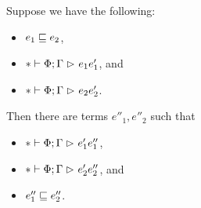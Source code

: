 \begin{lemma} \label{lem:confluence-acum}
Suppose we have the following:
\begin{itemize}[noitemsep]
  \item $e_1 \mathrel{\sqsubseteq} e_2$,
  \item $* \mathrel{\vdash} \Phi; \Gamma \mathrel{\rhd}_{} e_1{e'_1}$, and
  \item $* \mathrel{\vdash} \Phi; \Gamma \mathrel{\rhd}_{} e_2{e'_2}$.
\end{itemize}
Then there are terms $e''_1, e''_2$ such that
\begin{itemize}[noitemsep]
  \item $* \mathrel{\vdash} \Phi; \Gamma \mathrel{\rhd}_{} e'_1{e''_1}$,
  \item $* \mathrel{\vdash} \Phi; \Gamma \mathrel{\rhd}_{} e'_2{e''_2}$, and
  \item $e''_1 \mathrel{\sqsubseteq} e''_2$.
\end{itemize}
\end{lemma}

